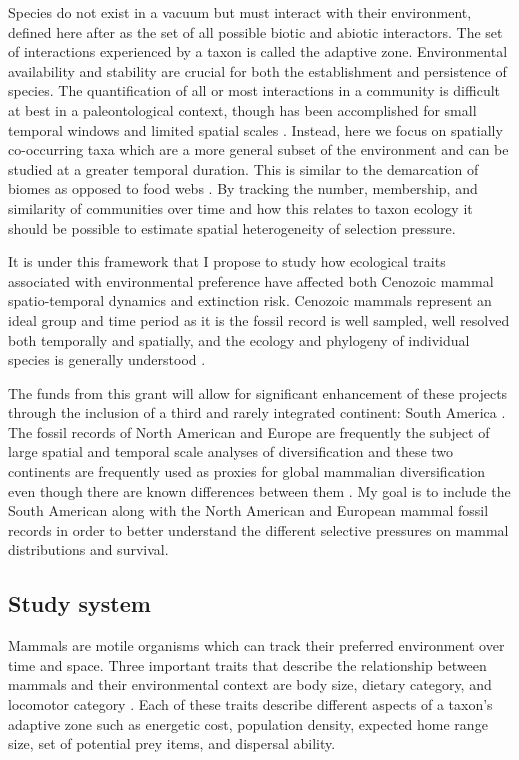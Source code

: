 \documentclass[11pt,letterpaper]{article}
\begin{document}
Species do not exist in a vacuum but must interact with their environment, defined here after \citet{Simpson1944} as the set of all possible biotic and abiotic interactors. The set of interactions experienced by a taxon is called the adaptive zone. Environmental availability and stability are crucial for both the establishment and persistence of species. The quantification of all or most interactions in a community is difficult at best in a paleontological context, though has been accomplished for small temporal windows and limited spatial scales \citep{Angielczyk2005,Mitchell2012,Roopnarine2007}. Instead, here we focus on spatially co-occurring taxa which are a more general subset of the environment and can be studied at a greater temporal duration. This is similar to the demarcation of biomes as opposed to food webs \citep{Vilhena2013b}. By tracking the number, membership, and similarity of communities over time and how this relates to taxon ecology it should be possible to estimate spatial heterogeneity of selection pressure.

It is under this framework that I propose to study how ecological traits associated with environmental preference have affected both Cenozoic mammal spatio-temporal dynamics and extinction risk. Cenozoic mammals represent an ideal group and time period as it is the fossil record is well sampled, well resolved both temporally and spatially, and the ecology and phylogeny of individual species is generally understood \citep{Alroy2009,Alroy2000g,Jernvall2002,Liow2008,Smith2004}. 

The funds from this grant will allow for significant enhancement of these projects through the inclusion of a third and rarely integrated continent: South America \citep{Stromberg2013,Marshall1982}. The fossil records of North American and Europe are frequently the subject of large spatial and temporal scale analyses of diversification \citep{Jernvall2004,Jernvall2002,Fortelius2002,Janis2000,Alroy1996a,Alroy1998,Alroy2000g,Liow2008,Raia2006,Tomiya2013} and these two continents are frequently used as proxies for global mammalian diversification even though there are known differences between them \citep{Liow2008,Tomiya2013}. My goal is to include the South American along with the North American and European mammal fossil records in order to better understand the different selective pressures on mammal distributions and survival.

\subsection{Study system}
Mammals are motile organisms which can track their preferred environment over time and space. Three important traits that describe the relationship between mammals and their environmental context are body size, dietary category, and locomotor category \citep{Smith2004,Smith2008b,Damuth1981a,Damuth1979,Jernvall2004,Lyons2005,Lyons2010}. Each of these traits describe different aspects of a taxon's adaptive zone such as energetic cost, population density, expected home range size, set of potential prey items, and dispersal ability.
\end{document}
